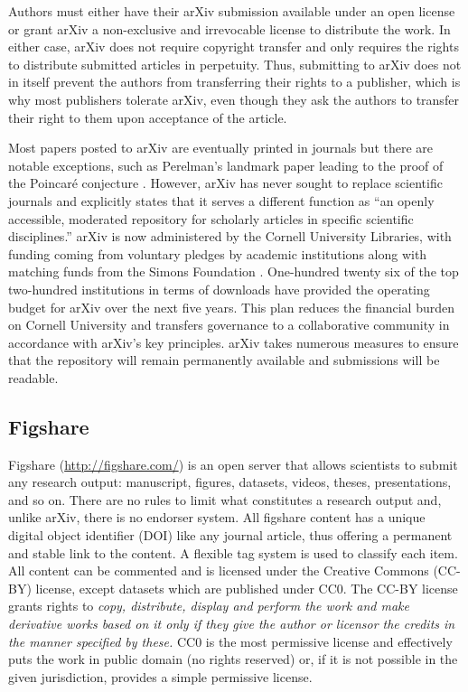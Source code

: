 \documentclass[letterpaper,twocolumn,superscriptaddress,showkeys]{revtex4}
\begin{document}
Authors must either have their arXiv submission available under an
open license or grant arXiv a non-exclusive and irrevocable license to
distribute the work. In either case, arXiv does not require copyright
transfer and only requires the rights to distribute submitted articles
in perpetuity. Thus, submitting to arXiv does not in itself prevent
the authors from transferring their rights to a publisher, which is
why most publishers tolerate arXiv, even though they ask the authors
to transfer their right to them upon acceptance of the article.

Most papers posted to arXiv are eventually printed in journals but
there are notable exceptions, such as Perelman's landmark paper
leading to the proof of the Poincar\'{e} conjecture
\cite{2002math.....11159P}.  However, arXiv has never sought to
replace scientific journals and explicitly states that it serves a
different function as ``an openly accessible, moderated repository for
scholarly articles in specific scientific disciplines.'' arXiv is now
administered by the Cornell University Libraries, with funding coming
from voluntary pledges by academic institutions along with matching
funds from the Simons Foundation \cite{arxiv_future}.  One-hundred
twenty six of the top two-hundred institutions in terms of downloads
have provided the operating budget for arXiv over the next five years.
This plan reduces the financial burden on Cornell University and
transfers governance to a collaborative community in accordance with
arXiv's key principles.  arXiv takes numerous measures to ensure that
the repository will remain permanently available and submissions will
be readable.

\subsection{Figshare}

Figshare (\href{http://figshare.com/}{http://figshare.com/}) is an
open server that allows scientists to submit any research output:
manuscript, figures, datasets, videos, theses, presentations, and so
on. There are no rules to limit what constitutes a research output
and, unlike arXiv, there is no endorser system. All figshare content
has a unique digital object identifier (DOI) like any journal article,
thus offering a permanent and stable link to the content.  A flexible
tag system is used to classify each item. All content can be commented
and is licensed under the Creative Commons (CC-BY) license, except
datasets which are published under CC0. The CC-BY license grants
rights to \emph{copy, distribute, display and perform the work and
  make derivative works based on it only if they give the author or
  licensor the credits in the manner specified by these.}  CC0 is the
most permissive license and effectively puts the work in public domain
(no rights reserved) or, if it is not possible in the given
jurisdiction, provides a simple permissive license.
\end{document}
